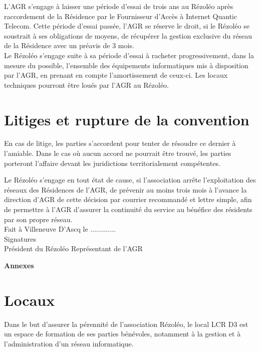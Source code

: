 \documentclass[12pt]{constitution}
\begin{document}
    L'AGR s'engage à laisser une période d'essai de trois ans au Rézoléo après raccordement de la Résidence par le Fournisseur d'Accès à Internet Quantic Telecom. Cette période d'essai passée, l'AGR se réserve le droit, si le Rézoléo se soustrait à ses obligations de moyens, de récupérer la gestion exclusive du réseau de la Résidence avec un préavis de 3 mois.\\

    Le Rézoléo s'engage suite à sa période d'essai à racheter progressivement, dans la mesure du possible, l'ensemble des équipements informatiques mis à disposition par l'AGR, en prenant en compte l'amortissement de ceux-ci. Les locaux techniques pourront être loués par l'AGR au Rézoléo.\\


\section{Litiges et rupture de la convention}

    En cas de litige, les parties s'accordent pour tenter de résoudre ce dernier à l'amiable. Dans le cas où aucun accord ne pourrait être trouvé, les parties porteront l'affaire devant les juridictions territorialement compétentes.


    Le Rézoléo s'engage en tout état de cause, si l'association arrête l'exploitation des réseaux des Résidences de l'AGR, de prévenir au moins trois mois à l'avance la direction d'AGR de cette décision par courrier recommandé et lettre simple, afin de permettre à l'AGR d'assurer la continuité du service au bénéfice des résidents par son propre réseau.\\

Fait à Villeneuve D'Ascq le .............\\


\noindent Signatures \\
Président du Rézoléo \hfill Représentant de l'AGR

\newpage

\begin{center}
\textbf{\large{Annexes}}
\end{center}
\noindent
\section{Locaux}

    Dans le but d'assurer la pérennité de l'association Rézoléo, le local LCR D3 est un espace de formation de ses parties bénévoles, notamment à la gestion et à l'administration d'un réseau informatique.\\
\end{document}
